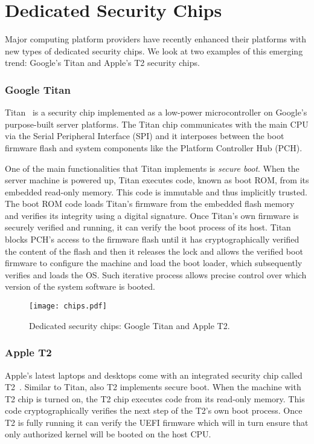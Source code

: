 \section*{Dedicated Security Chips}

Major computing platform providers have recently enhanced their platforms with new types of dedicated security chips. We look at two examples of this emerging trend: Google's Titan and Apple's T2 security chips.

\subsubsection*{Google Titan}

Titan~\cite{titan} is a security chip implemented as a low-power microcontroller on Google's purpose-built server platforms. The Titan chip communicates with the main CPU via the Serial Peripheral Interface (SPI) and it interposes between the boot firmware flash and system components like the Platform Controller Hub (PCH).

 One of the main functionalities that Titan implements is \emph{secure boot}. When the server machine is powered up, Titan executes code, known as boot ROM, from its embedded read-only memory. This code is immutable and thus implicitly trusted. The boot ROM code loads Titan's firmware from the embedded flash memory and verifies its integrity using a digital signature. Once Titan's own firmware is securely verified and running, it can verify the boot process of its host. Titan blocks PCH’s access to the firmware flash until it has cryptographically verified the content of the flash and then it releases the lock and allows the verified boot firmware to configure the machine and load the boot loader, which subsequently verifies and loads the OS. Such iterative process allows precise control over which version of the system software is booted. 

\begin{figure}[t]
	\centering
	\texttt{[image: chips.pdf]}
	\caption{Dedicated security chips: Google Titan and Apple T2.}
\label{fig:prototype}   
\end{figure}

 
\subsubsection*{Apple T2}
 
Apple's latest laptops and desktops come with an integrated security chip called T2~\cite{t2}. Similar to Titan, also T2 implements secure boot. When the machine with T2 chip is turned on, the T2 chip executes code from its read-only memory. This code cryptographically verifies the next step of the T2’s own boot process. Once T2 is fully running it can verify the UEFI firmware which will in turn ensure that only authorized kernel will be booted on the host CPU.


